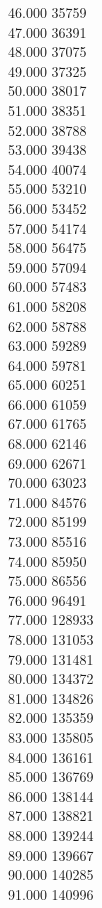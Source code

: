 { 46.000	35759 \\
 47.000	36391 \\
 48.000	37075 \\
 49.000	37325 \\
 50.000	38017 \\
 51.000	38351 \\
 52.000	38788 \\
 53.000	39438 \\
 54.000	40074 \\
 55.000	53210 \\
 56.000	53452 \\
 57.000	54174 \\
 58.000	56475 \\
 59.000	57094 \\
 60.000	57483 \\
 61.000	58208 \\
 62.000	58788 \\
 63.000	59289 \\
 64.000	59781 \\
 65.000	60251 \\
 66.000	61059 \\
 67.000	61765 \\
 68.000	62146 \\
 69.000	62671 \\
 70.000	63023 \\
 71.000	84576 \\
 72.000	85199 \\
 73.000	85516 \\
 74.000	85950 \\
 75.000	86556 \\
 76.000	96491 \\
 77.000	128933 \\
 78.000	131053 \\
 79.000	131481 \\
 80.000	134372 \\
 81.000	134826 \\
 82.000	135359 \\
 83.000	135805 \\
 84.000	136161 \\
 85.000	136769 \\
 86.000	138144 \\
 87.000	138821 \\
 88.000	139244 \\
 89.000	139667 \\
 90.000	140285 \\
 91.000	140996 \\
}
